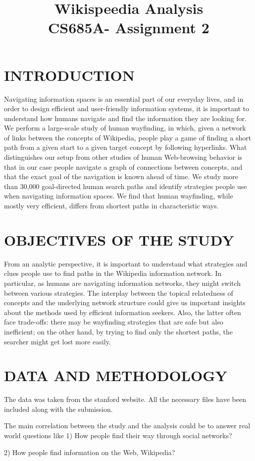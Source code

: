 \documentclass[a4paper, 12 pt, conference]{article}
\title{\LARGE \bf %
Wikispeedia Analysis
\\
\textnormal{\bf  CS685A- Assignment 2}
\centering{\author{ \bf Snehal Raj}
}
}
\begin{document}
\maketitle
\thispagestyle{plain}
\pagestyle{plain}
\section{\textbf{INTRODUCTION}}
Navigating information spaces is an essential part of our everyday
lives, and in order to design efficient and user-friendly information
systems, it is important to understand how humans navigate and
find the information they are looking for. We perform a large-scale
study of human wayfinding, in which, given a network of links between the concepts of Wikipedia, people play a game of finding a
short path from a given start to a given target concept by following
hyperlinks. What distinguishes our setup from other studies of human Web-browsing behavior is that in our case people navigate a
graph of connections between concepts, and that the exact goal of
the navigation is known ahead of time. We study more than 30,000
goal-directed human search paths and identify strategies people use
when navigating information spaces. We find that human wayfinding, while mostly very efficient, differs from shortest paths in characteristic ways.
\section{\textbf{OBJECTIVES OF THE STUDY}}
From an analytic perspective, it is important to understand what
strategies and clues people use to find paths in the Wikipedia information network. In particular, as humans are navigating information networks, they might switch between various strategies. The
interplay between the topical relatedness of concepts and the underlying network structure could give us important insights about
the methods used by efficient information seekers. Also, the latter
often face trade-offs: there may be wayfinding strategies that are
safe but also inefficient; on the other hand, by trying to find only
the shortest paths, the searcher might get lost more easily.

\section{\textbf{DATA AND METHODOLOGY}}

The data was taken from the stanford website. All the necessary files have been included along with the submission.

The main correlation between the study and the analysis could be to answer real world questions like
1) How people find their way
through social networks?

2) How people find information
on the Web, Wikipedia?
\end{document}

